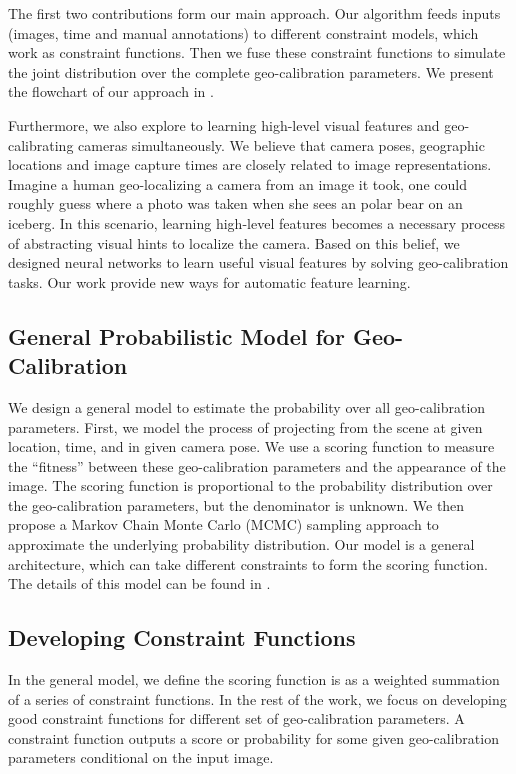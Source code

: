 The first two contributions form our main approach. Our
algorithm feeds inputs (images, time and manual annotations) to
different constraint models, which work as constraint functions. Then
we fuse these constraint functions to simulate the joint distribution
over the complete geo-calibration parameters. We present the flowchart of
our approach in .

Furthermore, we also explore to learning high-level visual features
and geo-calibrating cameras simultaneously.  We believe that camera
poses, geographic locations and image capture times are closely
related to image representations. 
Imagine a human geo-localizing a camera from an image it took, one
could roughly guess where a photo was taken when she sees an polar
bear on an iceberg. In this scenario, learning high-level
features becomes a necessary process of abstracting visual hints to
localize the camera.
Based on this belief, we designed neural networks to learn useful
visual features by solving geo-calibration tasks. Our work provide new
ways for automatic feature learning.


\subsection{General Probabilistic Model for Geo-Calibration}
We design a general model to estimate the probability over all
geo-calibration parameters. First, we model the process of projecting
from the scene at given location, time, and in given camera pose.
We use a scoring function to measure the ``fitness'' between these
geo-calibration parameters and the appearance of the image. 
The scoring function is proportional to the probability distribution
over the geo-calibration parameters, but the denominator is unknown. We
then propose a Markov Chain Monte Carlo (MCMC) sampling approach to
approximate the underlying probability distribution.
Our model is a general architecture, which can take different
constraints to form the scoring function. The details of this model
can be found in .

\subsection{Developing Constraint Functions}
In the general model, we define the scoring function is as a weighted
summation of a series of constraint functions.
In the rest of the work, we focus on developing good constraint
functions for different set of geo-calibration parameters. 
A constraint function outputs a score or probability for some given
geo-calibration parameters conditional on the input image.

